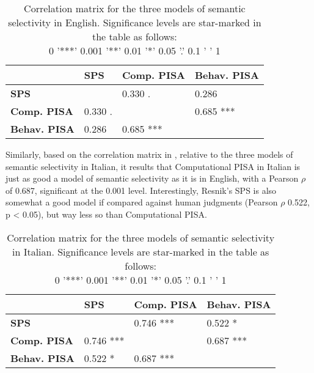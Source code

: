 \begin{table}[htb] %
\caption{Correlation matrix for the three models of semantic selectivity in English. Significance levels are star-marked in the table as follows:\\ 0 '***'  0.001 '**' 0.01 '*' 0.05 '.' 0.1 ' ' 1}
\begin{tabular}{l|lll}
      & \textbf{SPS}   & \textbf{Comp. PISA}    & \textbf{Behav. PISA}    \\
\hline
\textbf{SPS}   &       & 0.330 .     & 0.286    \\
\textbf{Comp. PISA} & 0.330 .  &          & 0.685 *** \\
\textbf{Behav. PISA} & 0.286 & 0.685 *** &     
\end{tabular}
\end{table}

Similarly, based on the correlation matrix in , relative to the three models of semantic selectivity in Italian, it results that Computational PISA in Italian is just as good a model of semantic selectivity as it is in English, with a Pearson $\rho$ of 0.687, significant at the 0.001 level. Interestingly, Resnik's SPS is also somewhat a good model if compared against human judgments (Pearson $\rho$ 0.522, p < 0.05), but way less so than Computational PISA.

\begin{table}[htb] %
\caption{Correlation matrix for the three models of semantic selectivity in Italian. Significance levels are star-marked in the table as follows:\\ 0 '***'  0.001 '**' 0.01 '*' 0.05 '.' 0.1 ' ' 1}
\begin{tabular}{l|lll}
      & \textbf{SPS}   & \textbf{Comp. PISA}    & \textbf{Behav. PISA}    \\
\hline
\textbf{SPS}   &       & 0.746 ***     & 0.522 *    \\
\textbf{Comp. PISA} & 0.746 ***  &          & 0.687 *** \\
\textbf{Behav. PISA} & 0.522 * & 0.687 *** &     
\end{tabular}
\end{table}

